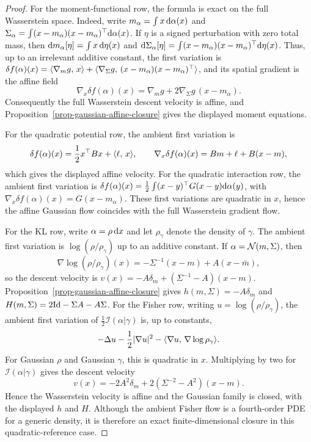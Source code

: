 \begin{proof}
	For the moment-functional row, the formula is exact on the full Wasserstein space. Indeed, write $m_\alpha=\int x\,\mathrm{d}\alpha(x)$ and $\Sigma_\alpha=\int (x-m_\alpha)(x-m_\alpha)^\top\mathrm{d}\alpha(x)$. If \(\eta\) is a signed perturbation with zero total mass, then $\mathrm{d} m_\alpha[\eta]=\int x\,\mathrm{d}\eta(x)$ and $\mathrm{d}\Sigma_\alpha[\eta]=\int (x-m_\alpha)(x-m_\alpha)^\top\mathrm{d}\eta(x)$. Thus, up to an irrelevant additive constant, the first variation is $\delta f(\alpha)(x)=\langle \nabla_m g,\,x\rangle+\langle \nabla_\Sigma g,\,(x-m_\alpha)(x-m_\alpha)^\top\rangle$,
	and its spatial gradient is the affine field
	\[
		\nabla_x\delta f(\alpha)(x)
		=
		\nabla_m g+2\nabla_\Sigma g\,(x-m_\alpha).
	\]
	Consequently the full Wasserstein descent velocity is affine, and Proposition~\ref{prop-gaussian-affine-closure} gives the displayed moment equations.

	For the quadratic potential row, the ambient first variation is
	\[
		\delta f(\alpha)(x)=\frac12x^\top Bx+\langle \ell,\,x\rangle,
		\qquad
		\nabla_x\delta f(\alpha)(x)=B m+\ell+B(x-m),
	\]
	which gives the displayed affine velocity. For the quadratic interaction row, the ambient first variation is $\delta f(\alpha)(x)=\frac12\int (x-y)^\top G(x-y)\mathrm{d}\alpha(y)$, with $\nabla_x\delta f(\alpha)(x)=G(x-m_\alpha)$.
	These first variations are quadratic in \(x\), hence the affine Gaussian flow coincides with the full Wasserstein gradient flow.

	For the KL row, write $\alpha=\rho\,\mathrm{d} x$ and let $\rho_\gamma$ denote the density of $\gamma$. The ambient first variation is \(\log(\rho/\rho_\gamma)\) up to an additive constant. If \(\alpha=\mathcal{N}(m,\Sigma)\), then
	\[
		\nabla\log(\rho/\rho_\gamma)(x)
		=
		-\Sigma^{-1}(x-m)+A(x-\bar m),
	\]
	so the descent velocity is
	\(v(x)=-A\delta_m+(\Sigma^{-1}-A)(x-m)\).
	Proposition~\ref{prop-gaussian-affine-closure} gives \(h(m,\Sigma)=-A\delta_m\) and \(H(m,\Sigma)=2\mathrm{Id}-\Sigma A-A\Sigma\). For the Fisher row, writing \(u=\log(\rho/\rho_\gamma)\), the ambient first variation of \(\frac12\mathcal I(\alpha|\gamma)\) is, up to constants,
	\[
		-\Delta u-\frac12|\nabla u|^2-\langle \nabla u,\,\nabla\log\rho_\gamma\rangle.
	\]
	For Gaussian \(\rho\) and Gaussian \(\gamma\), this is quadratic in \(x\). Multiplying by two for \(\mathcal I(\alpha|\gamma)\) gives the descent velocity
	\[
		v(x)=-2A^2\delta_m+2(\Sigma^{-2}-A^2)(x-m).
	\]
	Hence the Wasserstein velocity is affine and the Gaussian family is closed, with the displayed \(h\) and \(H\). Although the ambient Fisher flow is a fourth-order PDE for a generic density, it is therefore an exact finite-dimensional closure in this quadratic-reference case.


\end{proof}
